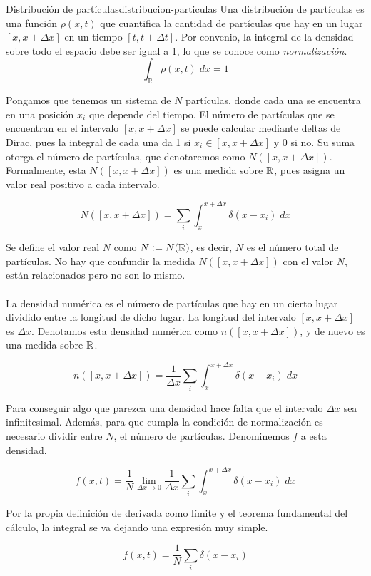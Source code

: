 \begin{definicion}{Distribución de partículas}{distribucion-particulas}
Una distribución de partículas es una función $\rho(x,t)$ que cuantifica la cantidad de partículas que hay en un lugar $[x,x+\Delta x]$ en un tiempo $[t,t+\Delta t]$. Por convenio, la integral de la densidad sobre todo el espacio debe ser igual a 1, lo que se conoce como \textit{normalización}.
\[\int_\mathbb R\rho(x,t)\;dx=1\]
\end{definicion}

Pongamos que tenemos un sistema de $N$ partículas, donde cada una se encuentra en una posición $x_i$ que depende del tiempo. El número de partículas que se encuentran en el intervalo $[x,x+\Delta x]$ se puede calcular mediante deltas de Dirac, pues la integral de cada una da 1 si $x_i\in[x,x+\Delta x]$ y 0 si no. Su suma otorga el número de partículas, que denotaremos como $N([x,x+\Delta x])$. Formalmente, esta $N([x,x+\Delta x])$ es una medida sobre $\mathbb{R}$, pues asigna un valor real positivo a cada intervalo.

\[N([x,x+\Delta x])=\sum_i\int_{x}^{x+\Delta x}\delta(x-x_i)\;dx\]

Se define el valor real $N$ como $N:=N(\mathbb{R})$, es decir, $N$ es el número total de partículas. No hay que confundir la medida $N([x,x+\Delta x])$ con el valor $N$, están relacionados pero no son lo mismo.
\\\\
La densidad numérica es el número de partículas que hay en un cierto lugar dividido entre la longitud de dicho lugar. La longitud del intervalo $[x,x+\Delta x]$ es $\Delta x$. Denotamos esta densidad numérica como $n([x,x+\Delta x])$, y de nuevo es una medida sobre $\mathbb{R}$.

\[n([x,x+\Delta x])=\frac1{\Delta x}\sum_i\int_{x}^{x+\Delta x}\delta(x-x_i) \;dx\]

Para conseguir algo que parezca una densidad hace falta que el intervalo $\Delta x$ sea infinitesimal. Además, para que cumpla la condición de normalización es necesario dividir entre $N$, el número de partículas. Denominemos $f$ a esta densidad.

\[f(x,t)=\frac1N\lim_{\Delta x\to0}\frac1{\Delta x}\sum_i\int_{x}^{x+\Delta x}\delta(x-x_i) \;dx\]

Por la propia definición de derivada como límite y el teorema fundamental del cálculo, la integral se va dejando una expresión muy simple. 

\begin{equation}
    f(x,t)=\frac1N\sum_i\delta(x-x_i)
    \label{eq:densidad_N_finito}
\end{equation}

